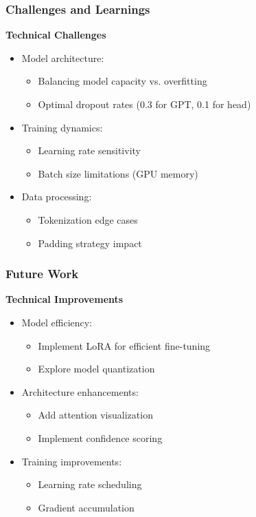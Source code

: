 \documentclass{beamer}
\begin{document}
\begin{frame}
\frametitle{Challenges and Learnings}
\textbf{Technical Challenges}
\begin{itemize}
  \item Model architecture:
  \begin{itemize}
    \item Balancing model capacity vs. overfitting
    \item Optimal dropout rates (0.3 for GPT, 0.1 for head)
  \end{itemize}
  \item Training dynamics:
  \begin{itemize}
    \item Learning rate sensitivity
    \item Batch size limitations (GPU memory)
  \end{itemize}
  \item Data processing:
  \begin{itemize}
    \item Tokenization edge cases
    \item Padding strategy impact
  \end{itemize}
\end{itemize}
\end{frame}

\begin{frame}
\frametitle{Future Work}
\textbf{Technical Improvements}
\begin{itemize}
  \item Model efficiency:
  \begin{itemize}
    \item Implement LoRA for efficient fine-tuning
    \item Explore model quantization
  \end{itemize}
  \item Architecture enhancements:
  \begin{itemize}
    \item Add attention visualization
    \item Implement confidence scoring
  \end{itemize}
  \item Training improvements:
  \begin{itemize}
    \item Learning rate scheduling
    \item Gradient accumulation
  \end{itemize}
\end{itemize}
\end{frame}
\end{document}

